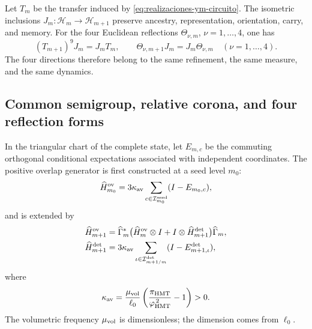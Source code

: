 Let \(T_m\) be the transfer induced by
\eqref{eq:realizaciones-ym-circuito}. The isometric inclusions
\(J_m:\mathcal H_m\to\mathcal H_{m+1}\) preserve ancestry,
representation, orientation, carry, and memory. For the four Euclidean
reflections \(\Theta_{\nu,m}\), \(\nu=1,\ldots,4\), one has
\begin{equation}\label{eq:realizaciones-ym-entrelazamiento}
 (T_{m+1})^9J_m=J_mT_m,
 \qquad
 \Theta_{\nu,m+1}J_m=J_m\Theta_{\nu,m}
 \quad(\nu=1,\ldots,4).
\end{equation}
The four directions therefore belong to the same refinement, the same
measure, and the same dynamics.

\subsection*{Common semigroup, relative corona, and four reflection forms}

In the triangular chart of the complete state, let \(E_{m,c}\) be the commuting
orthogonal conditional expectations associated with independent
coordinates. The positive overlap generator is first constructed at
a seed level \(m_0\):
\begin{equation}\label{eq:realizaciones-ym-generador}
 \widehat H_{m_0}^{\rm ov}
 =3\kappa_{\rm av}
  \sum_{c\in\mathcal I_{m_0}^{\rm seed}}(I-E_{m_0,c}),
\end{equation}
and is extended by
\begin{equation}\label{eq:realizaciones-ym-generador-refinado}
 \begin{aligned}
 \widehat H_{m+1}^{\rm ov}
 &=\widehat\Gamma_m^*
   \bigl(\widehat H_m^{\rm ov}\otimes I+
         I\otimes\widehat H_{m+1}^{\rm det}\bigr)
   \widehat\Gamma_m,\\
 \widehat H_{m+1}^{\rm det}
 &=3\kappa_{\rm av}
   \sum_{\iota\in\mathcal I_{m+1/m}^{\rm det}}
   (I-E_{m+1,\iota}^{\rm det}),
 \end{aligned}
\end{equation}
where
\begin{equation}\label{eq:realizaciones-ym-kappa}
 \kappa_{\rm av}
 =\frac{\mu_{\rm vol}}{\ell_0}
  \left(\frac{\pi_{\rm HMT}}{\varphi_{\rm HMT}^{\,2}}-1\right)>0.
\end{equation}
The volumetric frequency \(\mu_{\rm vol}\) is dimensionless; the dimension
comes from \(\ell_0\).

